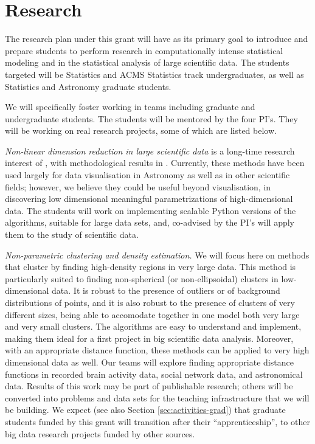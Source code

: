 \section{Research}
\label{sec:research}

The research plan under this grant will have as its primary goal to
introduce and prepare students to perform research in computationally
intense statistical modeling and in the statistical analysis of large
scientific data. The students targeted will be Statistics and ACMS
Statistics track undergraduates, as well as Statistics and Astronomy
graduate students. 

We will specifically foster working in teams including graduate and
undergraduate students. The students will be mentored by the four
PI's. They will be working on real research projects, some of which
are listed below. 
\bits
\item {\em Non-linear dimension reduction in large scientific data} is a long-time research interest of \meila, with methodological results in \cite{x}. Currently, these methods have been used largely for data visualisation in Astronomy as well as in other scientific fields; however, we believe they could be useful beyond visualisation, in discovering low dimensional meaningful parametrizations of high-dimensional data. The students will work on implementing scalable Python versions of the algorithms, suitable for large data sets, and, co-advised by the PI's will apply them to the study of scientific data.
\item {\em Non-parametric clustering and density estimation.} We will
  focus here on methods that cluster by finding high-density regions
  in very large data. This method is particularly suited to finding
  non-spherical (or non-ellipsoidal) clusters in low-dimensional
  data. It is robust to the presence of outliers or of background
  distributions of points, and it is also robust to the presence of
  clusters of very different sizes, being able to accomodate together
  in one model both very large and very small clusters. The algorithms
  are easy to understand and implement, making them ideal for a first
  project in big scientific data analysis. Moreover, with an
  appropriate distance function, these methods can be applied to very
  high dimensional data as well. Our teams will explore finding
  appropriate distance functions in recorded brain activity data,
  social network data, and astronomical data.  
\eits
%
Results of this work may be part of publishable research; others will
be converted into problems and data sets for the teaching
infrastructure that we will be building. We expect (see also Section
\ref{sec:activities-grad}) that graduate students funded by this grant
will transition after their ``apprenticeship'', to other big data
research projects funded by other sources. 
